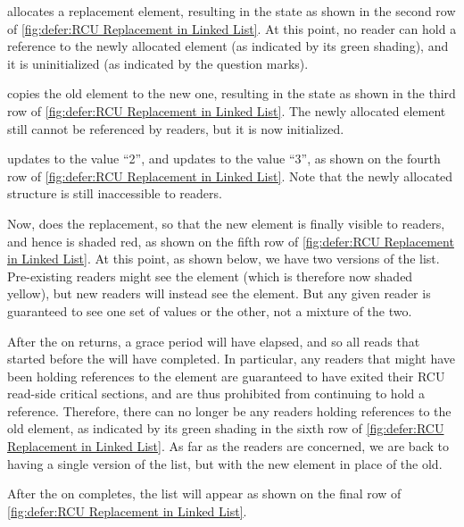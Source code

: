 \begin{fcvref}
 allocates a replacement element,
resulting in the state as shown in the second row of
\cref{fig:defer:RCU Replacement in Linked List}.
At this point, no reader can hold a reference to the newly allocated
element (as indicated by its green shading), and it is uninitialized
(as indicated by the question marks).

 copies the old element to the new one, resulting in the
state as shown in the third row of
\cref{fig:defer:RCU Replacement in Linked List}.
The newly allocated element still cannot be referenced by readers, but
it is now initialized.

 updates  to the value ``2'', and
 updates  to the value ``3'',
as shown on the fourth row of
\cref{fig:defer:RCU Replacement in Linked List}.
Note that the newly allocated structure is still inaccessible to readers.

Now,  does the replacement, so that the new element is
finally visible to readers, and hence is shaded red, as shown on
the fifth row of
\cref{fig:defer:RCU Replacement in Linked List}.
At this point, as shown below, we have two versions of the list.
Pre-existing readers might see the  element (which is
therefore now shaded yellow), but
new readers will instead see the  element.
But any given reader is guaranteed to see one set of values or the
other, not a mixture of the two.

After the  on  returns,
a grace period will have elapsed, and so all reads that started before the
 will have completed.
In particular, any readers that might have been holding references
to the  element are guaranteed to have exited
their RCU read-side critical sections, and are thus prohibited from
continuing to hold a reference.
Therefore, there can no longer be any readers holding references
to the old element, as indicated by its green shading in the sixth row of
\cref{fig:defer:RCU Replacement in Linked List}.
As far as the readers are concerned, we are back to having a single version
of the list, but with the new element in place of the old.

After the  on  completes, the list will
appear as shown on the final row of
\cref{fig:defer:RCU Replacement in Linked List}.
\end{fcvref}

